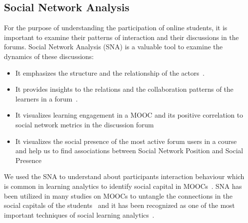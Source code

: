 \documentclass[format=acmsmall, review=false, screen=true]{acmart}
\begin{document}
\subsection{Social Network Analysis}
For the purpose of understanding the participation of online students, it is important to examine their patterns of interaction and their discussions in the forums. Social Network Analysis (SNA) is a valuable tool to examine the dynamics of these discussions: 
\begin{itemize}
 \item It emphasizes the structure and the relationship of the 
actors~\cite{butts2008social}.
 \item It provides insights to the relations and the collaboration patterns of the learners in a forum~\cite{rabbany2014collaborative}.
 \item It visualizes learning engagement in a MOOC and its positive correlation to social network metrics in the discussion forum~\cite{yang2013turn}
 \item It visualizes the social presence of the most active forum users in a course~\cite{oleksandra2016untangling} and help us to find associations between Social Network Position and Social Presence~\cite{joksimovic2015you,kovanovic2014source}
 \end{itemize}
We used the SNA to understand about participants interaction behaviour which is common in learning analytics to identify social capital in MOOCs~\cite{joksimovic2015you}. SNA has been utilized in many studies on MOOCs to untangle the connections in the social capitals of the students~\cite{oleksandra2016untangling,kovanovic2014source} and it has been recognized as one of the most important techniques of social learning analytics~\cite{shum2012social,ferguson2012social}.
\end{document}
